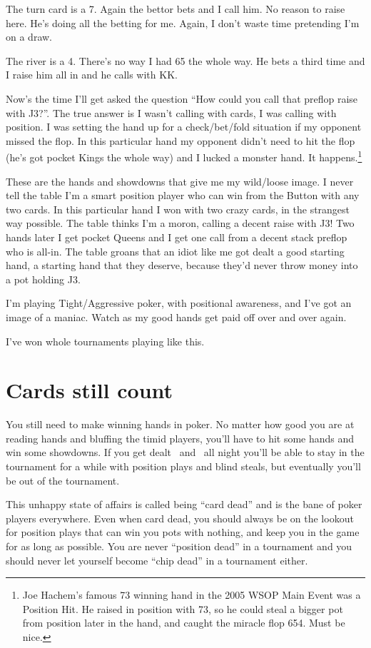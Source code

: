 The turn card is a 7. Again the bettor bets and I call him.
No reason to raise here. He's doing all the betting for me. Again,
I don't waste time pretending I'm on a draw.

The river is a 4. There's no way I had 65 the whole way. He bets a third
time and I raise him all in and he calls with KK.

Now's the time I'll get asked the question ``How could you call that
preflop raise with J3?''. The true answer is I wasn't calling with
cards, I was calling with position. I was setting the hand up for
a check/bet/fold situation if my opponent missed the flop. In this
particular hand my opponent didn't need to hit the flop (he's got pocket
Kings the whole way) and I lucked a monster hand.
It happens.\footnote{Joe Hachem's famous 73 winning hand in the 2005
WSOP Main Event was a Position Hit. He raised in position with 73, so
he could steal a bigger pot from position later in the hand, and caught
the miracle flop 654. Must be nice.}

These are the hands and showdowns that give me my wild/loose image.
I never tell the table I'm a smart position player who can
win from the Button with any two cards. In this particular hand I
won with two crazy cards, in the strangest way possible. The table
thinks I'm a moron, calling a decent raise with J3! Two hands later I get
pocket Queens and I get one call from a decent stack preflop who is all-in.
The table groans that an idiot like me got dealt a good
starting hand, a starting hand that they deserve, because they'd never
throw money into a pot holding J3.

I'm playing Tight/Aggressive poker, with positional awareness,
and I've got an image of a maniac. Watch as my good hands get paid
off over and over again.

I've won whole tournaments playing like this.

\section{Cards still count}

You still need to make winning hands in poker. No matter how good you
are at reading hands and bluffing the timid players, you'll have to
hit some hands and win some showdowns. If you get dealt
\tenh\twoc\ and \Qh\fivec\ all night you'll be able to stay in
the tournament for a while with position plays and blind steals,
but eventually you'll be out of the tournament.

This unhappy state of affairs is called being ``card dead'' and is
the bane of poker players everywhere. Even when card dead, you should always
be on the lookout for position plays that can win you pots with nothing,
and keep you in the game for as long as possible. You are never
``position dead'' in a tournament and you should never let yourself
become ``chip dead'' in a tournament either.

